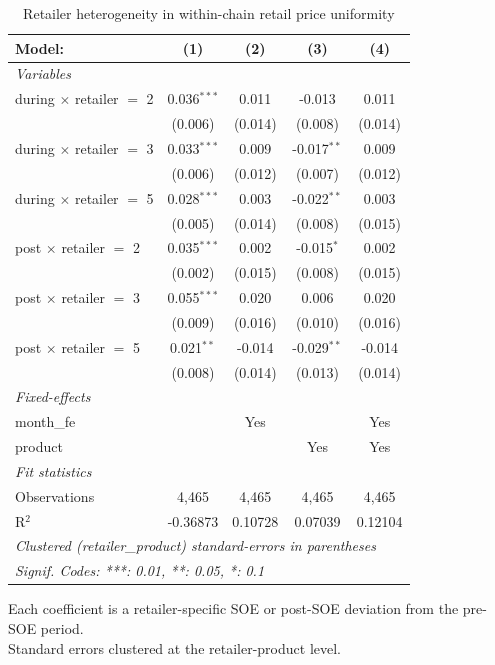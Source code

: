 
\begin{table}[htbp]
   \caption{\label{tab:uniformity_heterog_retail} Retailer heterogeneity in within-chain retail price uniformity}
   \centering
   \begin{tabular}{lcccc}
      \tabularnewline \midrule \midrule
      Model:                          & (1)           & (2)     & (3)           & (4)\\  
      \midrule
      \emph{Variables}\\
      during $\times$ retailer $=$ 2  & 0.036$^{***}$ & 0.011   & -0.013        & 0.011\\   
                                      & (0.006)       & (0.014) & (0.008)       & (0.014)\\   
      during $\times$ retailer $=$ 3  & 0.033$^{***}$ & 0.009   & -0.017$^{**}$ & 0.009\\   
                                      & (0.006)       & (0.012) & (0.007)       & (0.012)\\   
      during $\times$ retailer $=$ 5  & 0.028$^{***}$ & 0.003   & -0.022$^{**}$ & 0.003\\   
                                      & (0.005)       & (0.014) & (0.008)       & (0.015)\\   
      post $\times$ retailer $=$ 2    & 0.035$^{***}$ & 0.002   & -0.015$^{*}$  & 0.002\\   
                                      & (0.002)       & (0.015) & (0.008)       & (0.015)\\   
      post $\times$ retailer $=$ 3    & 0.055$^{***}$ & 0.020   & 0.006         & 0.020\\   
                                      & (0.009)       & (0.016) & (0.010)       & (0.016)\\   
      post $\times$ retailer $=$ 5    & 0.021$^{**}$  & -0.014  & -0.029$^{**}$ & -0.014\\   
                                      & (0.008)       & (0.014) & (0.013)       & (0.014)\\   
      \midrule
      \emph{Fixed-effects}\\
      month\_fe                       &               & Yes     &               & Yes\\  
      product                         &               &         & Yes           & Yes\\  
      \midrule
      \emph{Fit statistics}\\
      Observations                    & 4,465         & 4,465   & 4,465         & 4,465\\  
      R$^2$                           & -0.36873      & 0.10728 & 0.07039       & 0.12104\\  
      \midrule \midrule
      \multicolumn{5}{l}{\emph{Clustered (retailer\_product) standard-errors in parentheses}}\\
      \multicolumn{5}{l}{\emph{Signif. Codes: ***: 0.01, **: 0.05, *: 0.1}}\\
   \end{tabular}
   
   \par \raggedright 
   Each coefficient is a retailer-specific SOE or post-SOE deviation from the pre-SOE period.\\
   Standard errors clustered at the retailer-product level.
\end{table}


